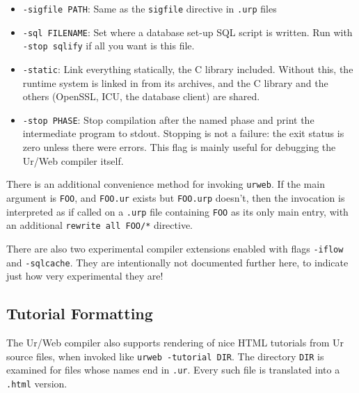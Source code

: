 \documentclass{article}
\newcommand{\cd}[1]{\texttt{#1}}
\begin{document}
\begin{itemize}
\item \texttt{-sigfile PATH}: Same as the \texttt{sigfile} directive in \texttt{.urp} files

\item \texttt{-sql FILENAME}: Set where a database set-up SQL script is written.  Run with \texttt{-stop sqlify} if all you want is this file.

\item \texttt{-static}: Link everything statically, the C library included.  Without this, the runtime system is linked in from its archives, and the C library and the others (OpenSSL, ICU, the database client) are shared.

\item \texttt{-stop PHASE}: Stop compilation after the named phase and print the intermediate program to stdout.  Stopping is not a failure: the exit status is zero unless there were errors.  This flag is mainly useful for debugging the Ur/Web compiler itself.
\end{itemize}

There is an additional convenience method for invoking \texttt{urweb}.  If the main argument is \texttt{FOO}, and \texttt{FOO.ur} exists but \texttt{FOO.urp} doesn't, then the invocation is interpreted as if called on a \texttt{.urp} file containing \texttt{FOO} as its only main entry, with an additional \texttt{rewrite all FOO/*} directive.

There are also two experimental compiler extensions enabled with flags \texttt{-iflow} and \texttt{-sqlcache}.  They are intentionally not documented further here, to indicate just how very experimental they are!

\subsection{Tutorial Formatting}

The Ur/Web compiler also supports rendering of nice HTML tutorials from Ur source files, when invoked like \cd{urweb -tutorial DIR}.  The directory \cd{DIR} is examined for files whose names end in \cd{.ur}.  Every such file is translated into a \cd{.html} version.
\end{document}
